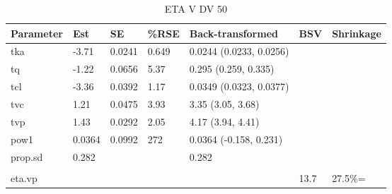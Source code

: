 \begin{table}
\centering\centering
\caption{ETA V DV 50}
\centering
\fontsize{8}{10}\selectfont
\begin{tabular}[t]{lllllll}
\toprule
\textbf{Parameter} & \textbf{Est} & \textbf{SE} & \textbf{\%RSE} & \textbf{Back-transformed} & \textbf{BSV} & \textbf{Shrinkage}\\
\midrule
tka & -3.71 & 0.0241 & 0.649 & 0.0244 (0.0233, 0.0256) &  & \\
\midrule
tq & -1.22 & 0.0656 & 5.37 & 0.295 (0.259, 0.335) &  & \\
\midrule
tcl & -3.36 & 0.0392 & 1.17 & 0.0349 (0.0323, 0.0377) &  & \\
\midrule
tvc & 1.21 & 0.0475 & 3.93 & 3.35 (3.05, 3.68) &  & \\
\midrule
tvp & 1.43 & 0.0292 & 2.05 & 4.17 (3.94, 4.41) &  & \\
\midrule
pow1 & 0.0364 & 0.0992 & 272 & 0.0364 (-0.158, 0.231) &  & \\
\midrule
prop.sd & 0.282 &  &  & 0.282 &  & \\
\midrule\\
eta.vp &  &  &  &  & 13.7 & 27.5\%=\\
\bottomrule
\end{tabular}
\end{table}